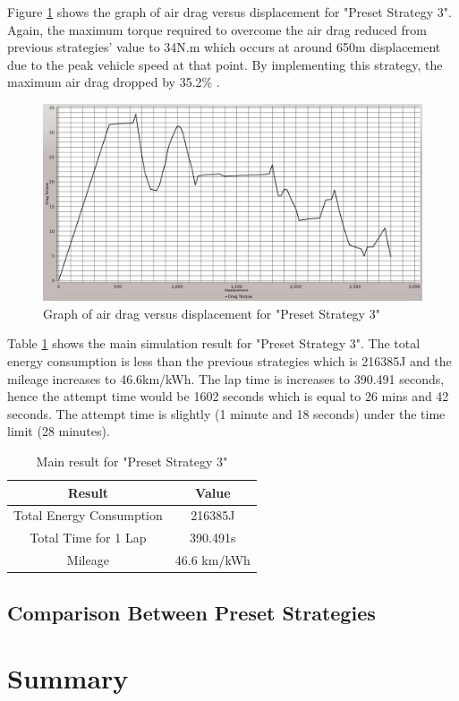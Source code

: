 Figure \ref{im:3_3} shows the graph of air drag versus displacement for "Preset Strategy 3". Again, the maximum torque required to overcome the air drag reduced from previous strategies' value to 34N.m which occurs at around 650m displacement due to the peak vehicle speed at that point. By implementing this strategy, the maximum air drag dropped by 35.2\% .

\begin{figure}[htb]
	\centering
	\includegraphics[width=6in]{images/3_3.jpg}
	\caption{Graph of air drag versus displacement for "Preset Strategy 3"}
	\label{im:3_3}
\end{figure}

Table \ref{tb:preset3Result} shows the main simulation result for "Preset Strategy 3". The total energy consumption is less than the previous strategies which is 216385J and the mileage increases to 46.6km/kWh. The lap time is increases to 390.491 seconds, hence the attempt time would be 1602 seconds which is equal to 26 mins and 42 seconds. The attempt time is slightly (1 minute and 18 seconds) under the time limit (28 minutes).

\begin{table}[htbp]
\begin{center}
\begin{tabular}{|c|c|}
\hline
\textbf{Result} & \textbf{Value} \\ \hline
Total Energy Consumption & 216385J \\ \hline
Total Time for 1 Lap & 390.491s \\ \hline
Mileage & 46.6 km/kWh \\ \hline
\end{tabular}
\end{center}
\caption{Main result for "Preset Strategy 3" }
\label{tb:preset3Result}
\end{table} \clearpage

\subsection{Comparison Between Preset Strategies}
\section{Summary}
